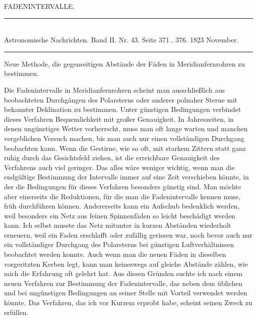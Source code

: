 \clearpage
{}
\hypertarget{native-450-fadenintervalle}{}
\begin{center}
{\large FADENINTERVALLE.}
\end{center}

\begin{center}
\rule{0.5\linewidth}{0.4pt}\\[2pt]
Astronomische Nachrichten. Band II. Nr. 43. Seite 371\,..\,376. 1823 November.\\[2pt]
\rule{0.5\linewidth}{0.4pt}
\end{center}

\begin{center}
Neue Methode, die gegenseitigen Abstände der Fäden in Meridianfernrohren zu bestimmen.
\end{center}

Die Fadenintervalle in Meridianfernrohren scheint man ausschließlich aus beobachteten Durchgängen des Polarsterns oder anderer polnaher
%
Sterne mit bekannter Deklination zu bestimmen. Unter günstigen Bedingungen verbindet dieses Verfahren Bequemlichkeit mit großer Genauigkeit. In Jahreszeiten, in denen ungünstiges Wetter vorherrscht, muss man oft lange warten und manchen vergeblichen Versuch machen, bis man auch nur einen vollständigen Durchgang beobachten kann. Wenn die Gestirne, wie so oft, mit starkem Zittern statt ganz ruhig durch das Gesichtsfeld ziehen, ist die erreichbare Genauigkeit des Verfahrens auch viel geringer. Das alles wäre weniger wichtig, wenn man die endgültige Bestimmung der Intervalle immer auf eine Zeit verschieben könnte, in der die Bedingungen für dieses Verfahren besonders günstig sind. Man möchte aber einerseits die Reduktionen, für die man die Fadenintervalle kennen muss, früh durchführen können. Andererseits kann ein Aufschub bedenklich werden, weil besonders ein Netz aus feinen Spinnenfäden so leicht beschädigt werden kann. Ich selbst musste das Netz mitunter in kurzen Abständen wiederholt erneuern, weil ein Faden erschlafft oder zufällig gerissen war, noch bevor auch nur ein vollständiger Durchgang des Polarsterns bei günstigen Luftverhältnissen beobachtet werden konnte. Auch wenn man die neuen Fäden in dieselben vorgeritzten Kerben legt, kann man keineswegs auf gleiche Abstände zählen, wie mich die Erfahrung oft gelehrt hat. Aus diesen Gründen suchte ich nach einem neuen Verfahren zur Bestimmung der Fadenintervalle, das neben dem üblichen und bei ungünstigen Bedingungen an seiner Stelle mit Vorteil verwendet werden könnte. Das Verfahren, das ich vor Kurzem erprobt habe, scheint seinen Zweck zu erfüllen.

